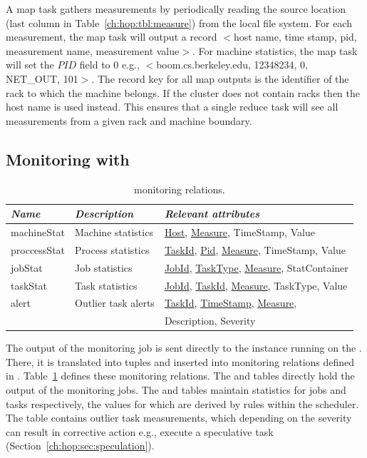 A map task gathers measurements by periodically reading the source location (last column in Table~\ref{ch:hop:tbl:measure}) from the local file system. 
For each measurement, the map task will output a record $<$host name, time stamp, pid, measurement name, measurement value$>$.
For machine statistics, the map task will set the $PID$ field to $0$ e.g., $<$boom.cs.berkeley.edu, 12348234, 0, NET\_OUT, 101$>$.
The record key for all map outputs is the identifier of the rack to which the machine belongs. If the cluster does not contain racks then 
the host name is used instead. This ensures that a single reduce task will see all measurements from a given rack and machine boundary. 

\subsection{Monitoring with \OVERLOG}

\begin{table}
\ssp
\centering
\begin{tabular}{|l|l|l|} \hline
\textit{Name}    & \textit{Description} & \textit{Relevant attributes} \\ \hline\hline
machineStat    & Machine statistics   & \underline{Host}, \underline{Measure}, TimeStamp, Value \\ \hline
proccessStat   & Process statistics    & \underline{TaskId}, \underline{Pid}, \underline{Measure}, TimeStamp, Value \\ \hline
jobStat              & Job statistics            & \underline{JobId}, \underline{TaskType}, \underline{Measure}, StatContainer \\ \hline
taskStat            & Task statistics          & \underline{JobId}, \underline{TaskId}, \underline{Measure}, TaskType, Value \\ \hline
alert                   & Outlier task alerts   & \underline{TaskId}, \underline{TimeStamp}, \underline{Measure}, \\
                           &                                   & Description, Severity \\ \hline
\end{tabular}
\caption{\JOL monitoring relations.}
\label{ch:hop:tbl:monitorCatalog}
\end{table}

The output of the monitoring job is sent directly to the \JOL instance running on the \JT. There, it is translated into \JOL
tuples and inserted into monitoring relations defined in \JOL. Table~\ref{ch:hop:tbl:monitorCatalog} defines these monitoring 
relations. The  and  tables directly hold the output of the monitoring jobs. The  
and  tables maintain statistics for jobs and tasks respectively, the values for which are derived by rules within the scheduler.  
The  table contains outlier task measurements, which depending on the severity can result in corrective action e.g., execute
a speculative task (Section~\ref{ch:hop:sec:speculation}). 

